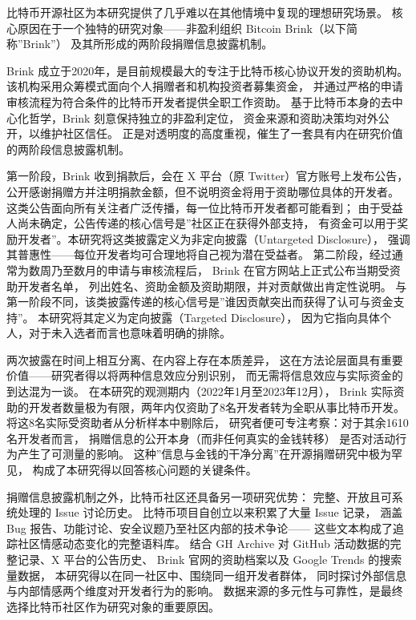 比特币开源社区为本研究提供了几乎难以在其他情境中复现的理想研究场景。
核心原因在于一个独特的研究对象——非盈利组织 Bitcoin Brink（以下简称”Brink”）
及其所形成的两阶段捐赠信息披露机制。

Brink 成立于2020年，是目前规模最大的专注于比特币核心协议开发的资助机构。
该机构采用众筹模式面向个人捐赠者和机构投资者募集资金，
并通过严格的申请审核流程为符合条件的比特币开发者提供全职工作资助。
基于比特币本身的去中心化哲学，Brink 刻意保持独立的非盈利定位，
资金来源和资助决策均对外公开，以维护社区信任。
正是对透明度的高度重视，催生了一套具有内在研究价值的两阶段信息披露机制。

第一阶段，Brink 收到捐款后，会在 X 平台（原 Twitter）官方账号上发布公告，
公开感谢捐赠方并注明捐款金额，但不说明资金将用于资助哪位具体的开发者。
这类公告面向所有关注者广泛传播，每一位比特币开发者都可能看到；
由于受益人尚未确定，公告传递的核心信号是”社区正在获得外部支持，
有资金可以用于奖励开发者”。本研究将这类披露定义为非定向披露（Untargeted Disclosure），
强调其普惠性——每位开发者均可合理地将自己视为潜在受益者。
第二阶段，经过通常为数周乃至数月的申请与审核流程后，
Brink 在官方网站上正式公布当期受资助开发者名单，
列出姓名、资助金额及资助期限，并对贡献做出肯定性说明。
与第一阶段不同，该类披露传递的核心信号是”谁因贡献突出而获得了认可与资金支持”。
本研究将其定义为定向披露（Targeted Disclosure），
因为它指向具体个人，对于未入选者而言也意味着明确的排除。

两次披露在时间上相互分离、在内容上存在本质差异，
这在方法论层面具有重要价值——研究者得以将两种信息效应分别识别，
而无需将信息效应与实际资金的到达混为一谈。
在本研究的观测期内（2022年1月至2023年12月），
Brink 实际资助的开发者数量极为有限，两年内仅资助了8名开发者转为全职从事比特币开发。
将这8名实际受资助者从分析样本中剔除后，
研究者便可专注考察：对于其余1610名开发者而言，
捐赠信息的公开本身（而非任何真实的金钱转移）
是否对活动行为产生了可测量的影响。
这种”信息与金钱的干净分离”在开源捐赠研究中极为罕见，
构成了本研究得以回答核心问题的关键条件。

捐赠信息披露机制之外，比特币社区还具备另一项研究优势：
完整、开放且可系统处理的 Issue 讨论历史。
比特币项目自创立以来积累了大量 Issue 记录，
涵盖 Bug 报告、功能讨论、安全议题乃至社区内部的技术争论——
这些文本构成了追踪社区情感动态变化的完整语料库。
结合 GH Archive 对 GitHub 活动数据的完整记录、X 平台的公告历史、
Brink 官网的资助档案以及 Google Trends 的搜索量数据，
本研究得以在同一社区中、围绕同一组开发者群体，
同时探讨外部信息与内部情感两个维度对开发者行为的影响。
数据来源的多元性与可靠性，是最终选择比特币社区作为研究对象的重要原因。

